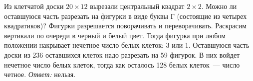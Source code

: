 \problem{}
Из клетчатой доски $20 \times 12$ вырезали центральный квадрат $2 \times 2$.
Можно ли оставшуюся часть разрезать на фигурки в виде буквы \textsf{Г}
(состоящие из четырех квадратиков)?
Фигурки разрешается поворачивать и переворачивать.
\solution
Раскрасим вертикали по очереди в черный и белый цвет.
Тогда фигурка при любом положении накрывает нечетное число белых клеток:
3 или 1.
Оставшуюся часть доски из 236 оставшихся клеток надо разрезать на 59 фигурок.
В них войдет нечетное число белых клеток, тогда как осталось
128 белых клеток~--- число четное.
\emph{Ответ:} нельзя.
\endproblem
